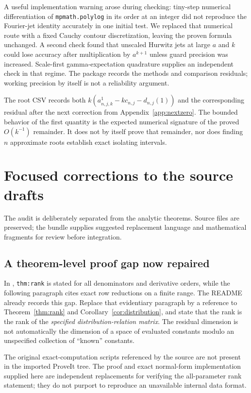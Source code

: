 \documentclass[11pt]{article}
\theoremstyle{definition}
\theoremstyle{remark}
\begin{document}
A useful implementation warning arose during checking: tiny-step numerical differentiation of \texttt{mpmath.polylog} in its order at an integer did not reproduce the Fourier-jet identity accurately in one initial test. We replaced that numerical route with a fixed Cauchy contour discretization, leaving the proven formula unchanged. A second check found that unscaled Hurwitz jets at large $a$ and $k$ could lose accuracy after multiplication by $a^{k+1}$ unless guard precision was increased. Scale-first gamma-expectation quadrature supplies an independent check in that regime. The package records the methods and comparison residuals; working precision by itself is not a reliability argument.

The root CSV records both $k(a_{n,j,k}^1-kc_{n,j}-d_{n,j}(1))$ and the corresponding residual after the next correction from Appendix~\ref{app:nextzero}. The bounded behavior of the first quantity is the expected numerical signature of the proved $O(k^{-1})$ remainder. It does not by itself prove that remainder, nor does finding $n$ approximate roots establish exact isolating intervals.

\section{Focused corrections to the source drafts}
\label{sec:audit}

The audit is deliberately separated from the analytic theorems. Source files are preserved; the bundle supplies suggested replacement language and mathematical fragments for review before integration.

\subsection{A theorem-level proof gap now repaired}
In \cite{RepoTower}, \texttt{thm:rank} is stated for all denominators and derivative orders, while the following paragraph cites exact row reductions on a finite range. The README already records this gap. Replace that evidentiary paragraph by a reference to Theorem~\ref{thm:rank} and Corollary~\ref{cor:distribution}, and state that the rank is the rank of the \emph{specified distribution-relation matrix}. The residual dimension is not automatically the dimension of a space of evaluated constants modulo an unspecified collection of ``known'' constants.

The original exact-computation scripts referenced by the source are not present in the imported ProveIt tree. The proof and exact normal-form implementation supplied here are independent replacements for verifying the all-parameter rank statement; they do not purport to reproduce an unavailable internal data format.
\end{document}

